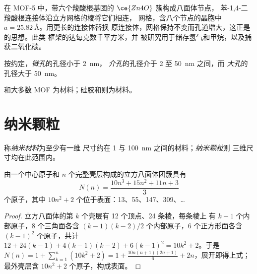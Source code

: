 在 MOF-5 中，带六个羧酸根基团的 $\ce{Zn4O}$ 簇构成八面体节点，
苯-1,4-二羧酸根连接体沿立方网格的棱将它们相连，
网格，含八个节点的晶胞中 $a = \qty{25.82}{\angstrom}$。用更长的连接体替换
原连接体，网格保持不变而孔道增大，这正是的思想。此类
框架的达每克数千平方米，并
被研究用于储存氢气和甲烷，以及捕获二氧化碳。

\begin{definition}[孔径]\label{def:b3:inorganic-materials:pores}
按约定，\emph{微孔}的孔径小于 \qty{2}{nm}，
\emph{介孔}的孔径介于 2 至 \qty{50}{nm} 之间，而
\emph{大孔}的孔径大于 \qty{50}{nm}。
\end{definition}

和大多数 MOF 为材料；硅胶和则为材料。

\section{纳米颗粒}

\begin{definition}[纳米材料]\label{def:b3:inorganic-materials:nano}
称\emph{纳米材料}为至少有一维
尺寸约在 1 与 \qty{100}{nm} 之间的材料；\emph{纳米颗粒}则
三维尺寸均在此范围内。
\end{definition}

\begin{proposition}[幻数团簇]\label{prop:b3:inorganic-materials:magic}
由一个中心原子和 $n$ 个完整壳层构成的立方八面体团簇具有
\[
  N(n) = \frac{10n^3 + 15n^2 + 11n + 3}{3}
\]
个原子，其中 $10n^2 + 2$ 个位于表面：13、55、147、309、\dots
\end{proposition}

\begin{proof}
立方八面体的第 $k$ 个壳层有 12 个顶点、24 条棱，每条棱上
有 $k - 1$ 个内部原子，8 个三角面各含 $(k - 1)(k - 2)/2$ 个内部原子，6
个正方形面各含 $(k - 1)^2$ 个原子，共计 $12 + 24(k - 1) + 4(k - 1)(k - 2) + 6(k - 1)^2 = 10k^2 + 2$。于是
$N(n) = 1 + \sum_{k=1}^{n}(10k^2 + 2) = 1 + \frac{10n(n + 1)(2n + 1)}{6} + 2n$，展开即得上式；
最外壳层含 $10n^2 + 2$ 个原子，构成表面。
\end{proof}

